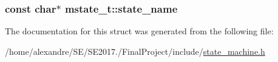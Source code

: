 \subsubsection[{\texorpdfstring{state\+\_\+name}{state_name}}]{\setlength{\rightskip}{0pt plus 5cm}const char$\ast$ mstate\+\_\+t\+::state\+\_\+name}\hypertarget{structmstate__t_a4896c554397f6e870631cfa20181f5cb}{}\label{structmstate__t_a4896c554397f6e870631cfa20181f5cb}


The documentation for this struct was generated from the following file\+:\begin{DoxyCompactItemize}
\item 
/home/alexandre/\+S\+E/\+S\+E2017./\+Final\+Project/include/\hyperlink{state__machine_8h}{state\+\_\+machine.\+h}\end{DoxyCompactItemize}
